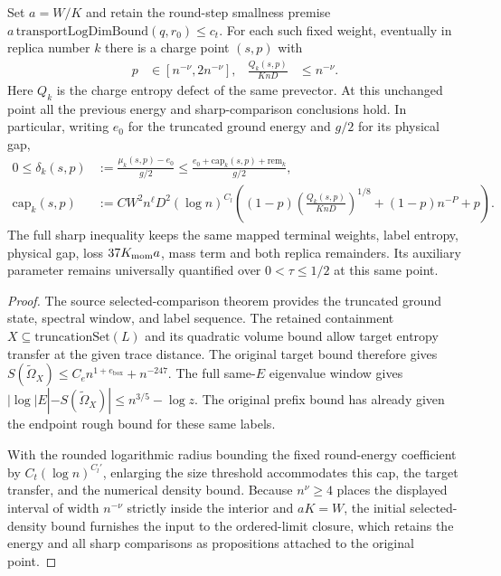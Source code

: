 \begin{lemma}
    Set $a=W/K$ and retain the round-step smallness premise
    $a\,\mathrm{transportLogDimBound}(q,r_0)\leq c_t$.
    For each such fixed weight, eventually in replica number $k$ there is
    a charge point $(s,p)$ with
    \begin{align}
        p                    & \in[n^{-\nu},2n^{-\nu}], &
        \frac{Q_k(s,p)}{KnD} & \leq n^{-\nu}.
        \label{eq:arealaw-source-selected-density-power}
    \end{align}
    Here $Q_k$ is the charge entropy defect of the same
    prevector.  At this unchanged point all the previous
    energy and sharp-comparison conclusions hold.  In particular, writing
    $e_0$ for the truncated ground energy and $g/2$ for its physical gap,
    \begin{align}
        0\leq\delta_k(s,p)
         & :=\frac{\mu_k(s,p)-e_0}{g/2}
        \leq\frac{e_0+\mathrm{cap}_k(s,p)+\mathrm{rem}_k}{g/2},\nonumber \\
        \mathrm{cap}_k(s,p)
         & :=CW^2n^\ell D^2(\log n)^{C_l}
        \left((1-p)\left(\frac{Q_k(s,p)}{KnD}\right)^{1/8}
        +(1-p)n^{-P}+p\right).
    \end{align}
    The full sharp inequality keeps the same mapped terminal weights,
    label entropy, physical gap, loss $37K_{\rm mom}a$, mass term and both
    replica remainders.  Its auxiliary parameter remains universally
    quantified over $0<\tau\leq1/2$ at this same point.
\end{lemma}
\begin{proof}
    \leanok
    The source selected-comparison theorem provides the truncated ground state,
    spectral window, and label sequence.  The retained
    containment $X\subseteq\mathrm{truncationSet}(L)$ and its quadratic
    volume bound allow target entropy transfer at the given trace
    distance.  The original target bound therefore gives
    $S(\widetilde\Omega_X)\leq C_en^{1+e_{\mathrm{box}}}+n^{-247}$.
    The full same-$E$ eigenvalue window gives
    $|\log|E|-S(\widetilde\Omega_X)|\leq n^{3/5}-\log z$.
    The original prefix bound has already given the endpoint rough
    bound for these same labels.

    With the rounded logarithmic radius bounding the fixed round-energy
    coefficient by $C_t(\log n)^{C_l'}$, enlarging the size
    threshold accommodates this cap, the target transfer, and the numerical density
    bound.  Because $n^\nu\geq4$ places the displayed interval of width
    $n^{-\nu}$ strictly inside the interior and $aK=W$, the
    initial selected-density bound furnishes the input to the ordered-limit
    closure, which retains the energy and all sharp
    comparisons as propositions attached to the original point.
\end{proof}

